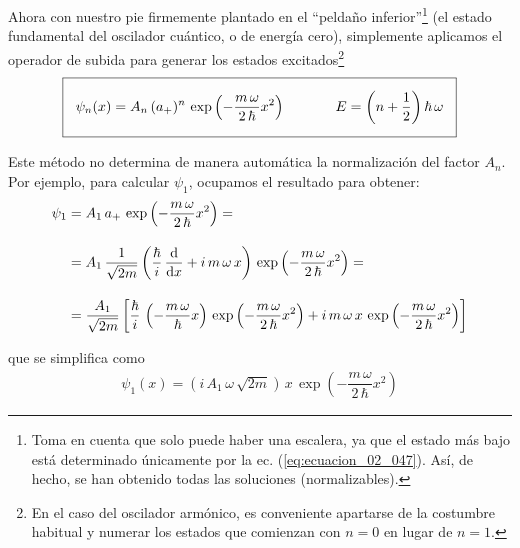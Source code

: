 Ahora con nuestro pie firmemente plantado en el \enquote{peldaño inferior}\footnote{Toma en cuenta que solo puede haber una escalera, ya que el estado más bajo está determinado únicamente por la ec. (\ref{eq:ecuacion_02_047}). Así, de hecho, se han obtenido todas las soluciones (normalizables).} (el estado fundamental del oscilador cuántico, o de energía cero), simplemente aplicamos el operador de subida para generar los estados excitados\footnote{ En el caso del oscilador armónico, es conveniente apartarse de la costumbre habitual y numerar los estados que comienzan con $n = 0$ en lugar de $n = 1$.}
\begin{align}
\setlength{\fboxsep}{3\fboxsep}\boxed{ \psi_{n} (x) = A_{n} \, (a_{+})^{n} \, \exp \left( - \dfrac{m \, \omega}{2 \, \hbar} x^{2} \right) \hspace{1.25cm} E = \left( n + \dfrac{1}{2} \right) \hbar \, \omega}
\label{eq:ecuacion_02_050}
\end{align}

Este método no determina de manera automática la normalización del factor $A_{n}$. Por ejemplo, para calcular $\psi_{1}$, ocupamos el resultado para obtener:
\begin{align*}
\psi_{1} &= A_{1} \, a_{+} \, \exp \left( - \dfrac{m \, \omega}{2 \, \hbar} x^{2} \right) = \\[1em]
&= A_{1} \, \dfrac{1}{\sqrt{2 m}} \left( \dfrac{\hbar}{i} \, \dv{x} + i \, m \, \omega \, x \right) \, \exp \left( - \dfrac{m \, \omega}{2 \, \hbar} x^{2} \right) = \\[1em]
&= \dfrac{A_{1}}{\sqrt{2 m}} \left[ \dfrac{\hbar}{i} \, \left( - \dfrac{m \, \omega}{\hbar} x \right)  \, \exp \left( - \dfrac{m \, \omega}{2 \, \hbar} x^{2} \right) + i \, m \, \omega \, x \, \exp \left( - \dfrac{m \, \omega}{2 \, \hbar} x^{2} \right) \right] 
\end{align*}

que se simplifica como
\begin{align}
\psi_{1} (x) = \left( i \, A_{1} \, \omega \, \sqrt{2 m} \right) \, x \, \exp \left( - \dfrac{m \, \omega}{2 \, \hbar} x^{2} \right)
\label{eq:ecuacion_02_051}
\end{align}

